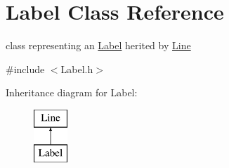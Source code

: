 \hypertarget{classLabel}{\section{\-Label \-Class \-Reference}
\label{classLabel}
}


class representing an \hyperlink{classLabel}{\-Label} herited by \hyperlink{classLine}{\-Line}  




{\ttfamily \#include $<$\-Label.\-h$>$}

\-Inheritance diagram for \-Label\-:\begin{figure}[H]
\begin{center}
\leavevmode
\includegraphics[height=2.000000cm]{classLabel}
\end{center}
\end{figure}
